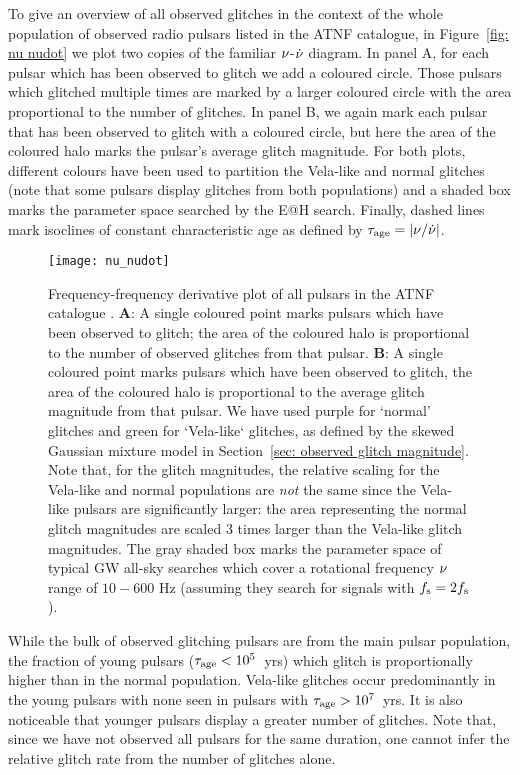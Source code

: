 \documentclass[../full_thesis/full_thesis.tex]{subfiles}
\begin{document}
To give an overview of all observed glitches in the context of the whole population of
observed radio pulsars listed in the ATNF catalogue, in Figure~\ref{fig: nu
nudot} we plot two copies of the familiar $\nu$-$\dot{\nu}$ diagram. In panel A, for each
pulsar which has been observed to glitch we add a coloured circle. Those
pulsars which glitched multiple times are marked by a larger coloured circle
with the area proportional to the number of glitches. In panel B, we again mark
each pulsar that has been observed to glitch with a coloured circle, but here
the area of the coloured halo marks the pulsar's average glitch magnitude.
For both plots, different
colours have been used to partition the Vela-like and normal glitches (note that some
pulsars display glitches from both populations) and a shaded box marks the
parameter space searched by the E@H search. Finally, dashed lines mark isoclines
of constant characteristic age as defined by $\tau_{\mathrm{age}} = \left|\nu/\dot{\nu}\right|$.
\begin{figure}[htb]
\centering
\texttt{[image: nu\_nudot]}
\caption{Frequency-frequency derivative plot of all pulsars in the ATNF
catalogue \citep{ATNF}. \textbf{A}: A single coloured point marks pulsars which have been
observed to glitch; the area of the coloured halo is proportional to the
number of observed glitches from that pulsar. \textbf{B}: A single coloured
point marks pulsars which have been observed to glitch, the area of the coloured
halo is proportional to the average glitch magnitude from that pulsar. We have used
purple for `normal' glitches and green for `Vela-like` glitches, as defined by
the skewed Gaussian mixture model in Section~\ref{sec: observed glitch magnitude}. Note
that, for the glitch magnitudes, the relative scaling for the Vela-like and
normal populations are \emph{not}
the same since the Vela-like pulsars are significantly larger: the area representing
the normal glitch magnitudes are scaled 3 times larger than the Vela-like glitch
magnitudes.
The gray shaded box marks the parameter space of typical GW all-sky searches which
cover a rotational frequency $\nu$ range of $10-600$ Hz (assuming they search for signals
with $f_{\textrm{s}}=2f_{\textrm{s}}$).}
\label{fig: nu nudot}
\end{figure}

While the bulk of observed glitching pulsars are from the main pulsar population, the
fraction of young pulsars ($\tau_{\mathrm{age}} < 10^{5}$~yrs) which glitch is proportionally
higher than in the normal population. Vela-like glitches occur predominantly
in the young pulsars with none seen in pulsars with $\tau_{\mathrm{age}} > 10^{7}$~yrs. It
is also noticeable that younger pulsars display a greater number of glitches. Note
that, since we have not observed all pulsars
for the same duration, one cannot infer the relative glitch rate from the
number of glitches alone.
\end{document}

